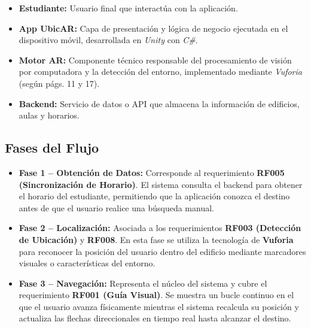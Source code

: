 \begin{flushleft}
		\begin{itemize}
			\item \textbf{Estudiante:} Usuario final que interactúa con la aplicación.
			\item \textbf{App UbicAR:} Capa de presentación y lógica de negocio ejecutada en el dispositivo móvil, desarrollada en \textit{Unity} con \textit{C\#}.
			\item \textbf{Motor AR:} Componente técnico responsable del procesamiento de visión por computadora y la detección del entorno, implementado mediante \textit{Vuforia} (según págs. 11 y 17).
			\item \textbf{Backend:} Servicio de datos o API que almacena la información de edificios, aulas y horarios.
		\end{itemize}
		
		\subsection*{Fases del Flujo}
		
		\begin{itemize}
			\item \textbf{Fase 1 – Obtención de Datos:}  
			Corresponde al requerimiento \textbf{RF005 (Sincronización de Horario)}. El sistema consulta el backend para obtener el horario del estudiante, permitiendo que la aplicación conozca el destino antes de que el usuario realice una búsqueda manual.
			
			\item \textbf{Fase 2 – Localización:}  
			Asociada a los requerimientos \textbf{RF003 (Detección de Ubicación)} y \textbf{RF008}. En esta fase se utiliza la tecnología de \textbf{Vuforia} para reconocer la posición del usuario dentro del edificio mediante marcadores visuales o características del entorno.
			
			\item \textbf{Fase 3 – Navegación:}  
			Representa el núcleo del sistema y cubre el requerimiento \textbf{RF001 (Guía Visual)}. Se muestra un bucle continuo en el que el usuario avanza físicamente mientras el sistema recalcula su posición y actualiza las flechas direccionales en tiempo real hasta alcanzar el destino.
		\end{itemize}
		
\end{flushleft}


